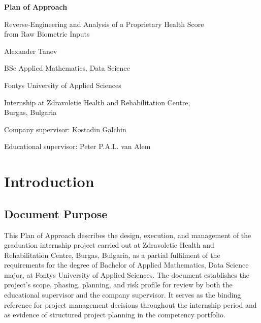 \documentclass[11pt,a4paper]{article}
\begin{document}
\begin{titlepage}
  \centering
  \vspace*{2cm}
  {\LARGE\bfseries Plan of Approach\par}
  \vspace{1.5cm}
  {\large Reverse-Engineering and Analysis of a Proprietary Health Score\\
  from Raw Biometric Inputs\par}
  \vspace{2cm}
  {\large Alexander Tanev\par}
  \vspace{0.5cm}
  {\normalsize BSc Applied Mathematics, Data Science\par}
  {\normalsize Fontys University of Applied Sciences\par}
  \vspace{1cm}
  {\normalsize Internship at Zdravoletie Health and Rehabilitation Centre,\\
  Burgas, Bulgaria\par}
  \vspace{1cm}
  {\normalsize Company supervisor: Kostadin Galchin\par}
  {\normalsize Educational supervisor: Peter P.A.L. van Alem\par}
  \vfill
\end{titlepage}

\tableofcontents
\newpage

\section{Introduction}

\subsection{Document Purpose}

This Plan of Approach describes the design, execution, and management of the graduation internship project carried out at Zdravoletie Health and Rehabilitation Centre, Burgas, Bulgaria, as a partial fulfilment of the requirements for the degree of Bachelor of Applied Mathematics, Data Science major, at Fontys University of Applied Sciences. The document establishes the project's scope, phasing, planning, and risk profile for review by both the educational supervisor and the company supervisor. It serves as the binding reference for project management decisions throughout the internship period and as evidence of structured project planning in the competency portfolio.
\end{document}
